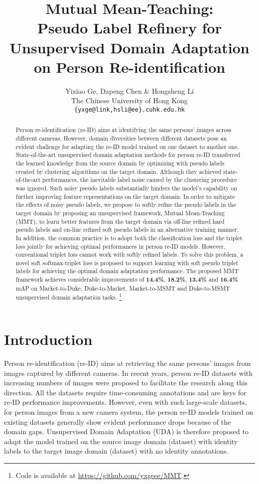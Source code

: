 \documentclass{article} \usepackage{iclr2020_conference,times}
\title{Mutual Mean-Teaching: \\Pseudo Label Refinery for Unsupervised Domain Adaptation on Person Re-identification}
\author{Yixiao Ge, Dapeng Chen \& Hongsheng Li \\
The Chinese University of Hong Kong\\
\texttt{\{yxge@link,hsli@ee\}.cuhk.edu.hk} \\
}
\begin{document}
\maketitle

\begin{abstract}
Person re-identification (re-ID) aims at identifying the same persons' images across different cameras. However, domain diversities between different datasets pose an evident challenge for adapting the re-ID model trained on one dataset to another one. State-of-the-art unsupervised domain adaptation methods for person re-ID transferred the learned knowledge from the source domain by optimizing with pseudo labels created by clustering algorithms on the target domain. Although they achieved state-of-the-art performances, the inevitable label noise caused by the clustering procedure was ignored. Such noisy pseudo labels substantially hinders the model's capability on further improving feature representations on the target domain. In order to mitigate the effects of noisy pseudo labels, we propose to softly refine the pseudo labels in the target domain by proposing an unsupervised framework, Mutual Mean-Teaching (MMT), to learn better features from the target domain via off-line refined hard pseudo labels and on-line refined soft pseudo labels in an alternative training manner. 
In addition, the common practice is to adopt both the classification loss and the triplet loss jointly for achieving optimal performances in person re-ID models. However, conventional triplet loss cannot work with softly refined labels. To solve this problem, a novel soft softmax-triplet loss is proposed to support learning with soft pseudo triplet labels for achieving the optimal domain adaptation performance. The proposed MMT framework achieves considerable improvements of \textbf{14.4\%}, \textbf{18.2\%}, \textbf{13.4\%} and \textbf{16.4\%} mAP on Market-to-Duke, Duke-to-Market, Market-to-MSMT and Duke-to-MSMT unsupervised domain adaptation tasks. 
\footnote{Code is available at \url{https://github.com/yxgeee/MMT}.}
\end{abstract}

\section{Introduction}
Person re-identification (re-ID) aims at retrieving the same persons' images from images captured by different cameras. 
In recent years, person re-ID datasets with increasing numbers of images
were proposed to facilitate the research along this direction. 
All the datasets require time-consuming annotations and are keys for re-ID performance improvements. However, even with such large-scale datasets, for person images from a new camera system, the person re-ID models trained on existing datasets generally show evident performance drops because of the domain gaps. Unsupervised Domain Adaptation (UDA) is therefore proposed to adapt the model trained on the source image domain (dataset) with identity labels to the target image domain (dataset) with no identity annotations.
\end{document}
